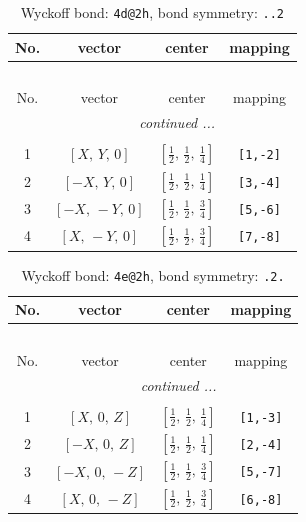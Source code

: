 \documentclass[fleqn,8pt]{jsarticle}
\begin{document}
\begin{longtable}{cccc}
\caption{Wyckoff bond: {\tt 4d@2h}, bond symmetry: {\tt ..2}}
 \\
 \hline \hline
No. & vector & center & mapping \\ \hline \endfirsthead

\multicolumn{3}{l}{\tablename\ \thetable{}} \\
 \hline \hline
No. & vector & center & mapping \\ \hline \endhead

 \hline \hline
\multicolumn{3}{r}{\footnotesize\it continued ...} \\ \endfoot

 \hline \hline
\multicolumn{3}{r}{} \\ \endlastfoot

1 & $\left[ X,\, Y,\, 0 \right]$ & $\left[ \frac{1}{2},\, \frac{1}{2},\, \frac{1}{4} \right]$ & {\tt [1,-2]} \\ \hline
2 & $\left[ - X,\, Y,\, 0 \right]$ & $\left[ \frac{1}{2},\, \frac{1}{2},\, \frac{1}{4} \right]$ & {\tt [3,-4]} \\ \hline
3 & $\left[ - X,\, - Y,\, 0 \right]$ & $\left[ \frac{1}{2},\, \frac{1}{2},\, \frac{3}{4} \right]$ & {\tt [5,-6]} \\ \hline
4 & $\left[ X,\, - Y,\, 0 \right]$ & $\left[ \frac{1}{2},\, \frac{1}{2},\, \frac{3}{4} \right]$ & {\tt [7,-8]} \\
\end{longtable}
\renewcommand{\arraystretch}{1.2}
\begin{longtable}{cccc}
\caption{Wyckoff bond: {\tt 4e@2h}, bond symmetry: {\tt .2.}}
 \\
 \hline \hline
No. & vector & center & mapping \\ \hline \endfirsthead

\multicolumn{3}{l}{\tablename\ \thetable{}} \\
 \hline \hline
No. & vector & center & mapping \\ \hline \endhead

 \hline \hline
\multicolumn{3}{r}{\footnotesize\it continued ...} \\ \endfoot

 \hline \hline
\multicolumn{3}{r}{} \\ \endlastfoot

1 & $\left[ X,\, 0,\, Z \right]$ & $\left[ \frac{1}{2},\, \frac{1}{2},\, \frac{1}{4} \right]$ & {\tt [1,-3]} \\ \hline
2 & $\left[ - X,\, 0,\, Z \right]$ & $\left[ \frac{1}{2},\, \frac{1}{2},\, \frac{1}{4} \right]$ & {\tt [2,-4]} \\ \hline
3 & $\left[ - X,\, 0,\, - Z \right]$ & $\left[ \frac{1}{2},\, \frac{1}{2},\, \frac{3}{4} \right]$ & {\tt [5,-7]} \\ \hline
4 & $\left[ X,\, 0,\, - Z \right]$ & $\left[ \frac{1}{2},\, \frac{1}{2},\, \frac{3}{4} \right]$ & {\tt [6,-8]} \\
\end{longtable}
\end{document}
